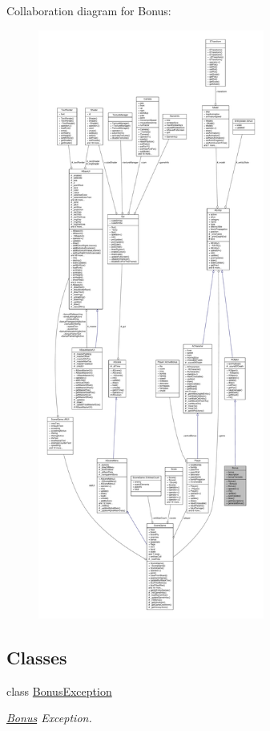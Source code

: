 Collaboration diagram for Bonus\+:
\nopagebreak
\begin{figure}[H]
\begin{center}
\leavevmode
\includegraphics[height=550pt]{class_bonus__coll__graph}
\end{center}
\end{figure}
\subsection*{Classes}
\begin{DoxyCompactItemize}
\item 
class \hyperlink{class_bonus_1_1_bonus_exception}{Bonus\+Exception}
\begin{DoxyCompactList}\small\item\em \hyperlink{class_bonus}{Bonus} Exception. \end{DoxyCompactList}\end{DoxyCompactItemize}
